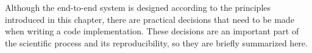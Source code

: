 
Although the end-to-end system is designed according to the
principles introduced in this chapter, there are practical
decisions that need to be made when writing a code
implementation. These decisions are an important part of the
scientific process and its reproducibility, so they are
briefly summarized here.
